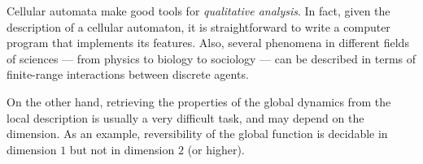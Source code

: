 \documentclass[12pt]{article}
\begin{document}
\iffalse
Given a one-head Turing machine
\begin{math}
T = \langle S, s,t,r, \Sigma, B, \delta \rangle,
\end{math}
it is straightforward to construct
a one-dimensional cellular automaton
\begin{math}
\Acal_T = \langle Q, \Neigh, f \rangle
\end{math}
that simulates $T$,
by putting
\begin{math}
Q = S \times \Sigma \times \{0,1\},
\end{math}
\begin{math}
\Neigh = \{-1,0,1\},
\end{math}
and, for $q_x = (s_x,\sigma_x,h_x)$,
\begin{math}
f(q_{-1},q_0,q_1) = (s,\sigma,h)
\end{math}
where:
\begin{itemize}
\item
$s$ is
\begin{math}
\pi_S \circ \delta(s_0,\sigma_0)
\end{math}
if $h_0=1$, and $s_0$ otherwise.
\item
$\sigma$ is
\begin{math}
\pi_\Sigma \circ \delta(s_0,\sigma_0)
\end{math}
if $h_0=1$, and $s_0$ otherwise.
\item
$h$ is 1 if
either $h_{-1}=1$ and
\begin{math}
\pi_{L,R} \circ \delta(s_{-1},\sigma_{-1}) = R,
\end{math}
or $h_{1}=1$ and
\begin{math}
\pi_{L,R} \circ \delta(s_1,\sigma_1) = L;
\end{math}
and 0 otherwise.
\end{itemize}
Then the $S$-component of $Q$ simulates the state alphabet of $T$,
the $\Sigma$-component of $Q$ simulates the input alphabet,
and the $\{0,1\}$-component simulates the read/write head.
\fi

\medskip

Cellular automata make good tools for \emph{qualitative analysis}.
In fact, given the description of a cellular automaton,
it is straightforward to write a computer program
that implements its features.
Also, several phenomena in different fields of sciences
--- from physics to biology to sociology ---
can be described in terms of finite-range interactions between discrete agents.

On the other hand,
retrieving the properties of the global dynamics from the local description
is usually a very difficult task,
and may depend on the dimension.
As an example,
reversibility of the global function
is decidable in dimension $1$ but not in dimension $2$ (or higher).
\end{document}
